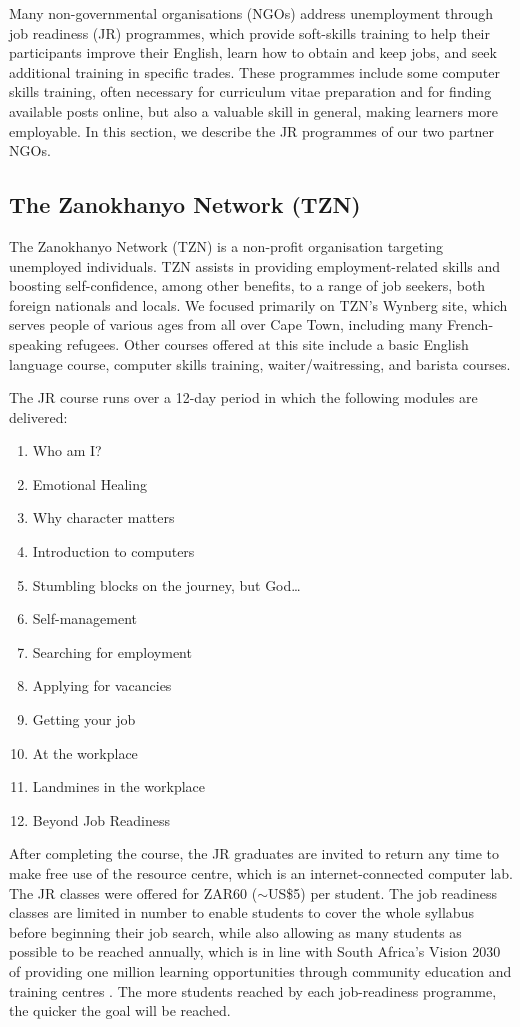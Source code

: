 Many non-governmental organisations (NGOs) address unemployment through job
readiness (JR) programmes, which provide soft-skills training to help their participants
improve their English, learn how to obtain and keep jobs, and seek additional training in
specific trades. These programmes include some computer skills training, often necessary
for curriculum vitae preparation and for finding available posts online, but also a valuable
skill in general, making learners more employable. In this section, we describe the JR
programmes of our two partner NGOs.

\subsection{The Zanokhanyo Network (TZN)}

The Zanokhanyo Network (TZN) is a non-profit organisation targeting unemployed
individuals. TZN assists in providing employment-related skills and boosting
self-confidence, among other benefits, to a range of job seekers, both foreign nationals
and locals. We focused primarily on TZN's Wynberg site, which serves people of various
ages from all over Cape Town, including many French-speaking refugees. Other courses
offered at this site include a basic English language course, computer skills training,
waiter/waitressing, and barista courses.

The JR course runs over a 12-day period in which the following modules are delivered:

\begin{enumerate}
    \item Who am I?
    \item Emotional Healing
    \item Why character matters
    \item Introduction to computers
    \item Stumbling blocks on the journey, but God\ldots
    \item Self-management
    \item Searching for employment
    \item Applying for vacancies
    \item Getting your job
    \item At the workplace
    \item Landmines in the workplace
    \item Beyond Job Readiness
\end{enumerate}

After completing the course, the JR graduates are invited to return any time to make
free use of the resource centre, which is an internet-connected computer lab. The JR
classes were offered for ZAR60 ($\sim$US\$5) per student. The job readiness classes are
limited in number to enable students to cover the whole syllabus before beginning
their job search, while also allowing as many students as possible to be reached annually,
which is in line with South Africa's Vision 2030 of providing one million learning
opportunities through community education and training centres
\cite{npc2013}. The more students reached by each
job-readiness programme, the quicker the goal will be reached.

